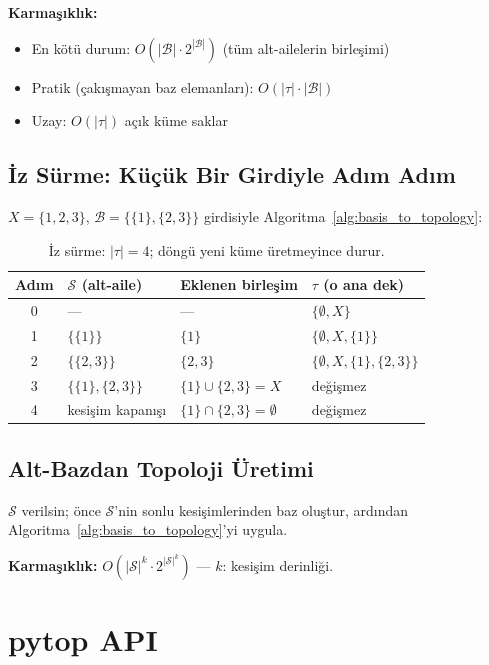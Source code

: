 \noindent\textbf{Karmaşıklık:}
\begin{itemize}
  \item En kötü durum: $O(|\mathcal{B}| \cdot 2^{|\mathcal{B}|})$
        (tüm alt-ailelerin birleşimi)
  \item Pratik (çakışmayan baz elemanları): $O(|\tau| \cdot |\mathcal{B}|)$
  \item Uzay: $O(|\tau|)$ açık küme saklar
\end{itemize}

\subsection{İz Sürme: Küçük Bir Girdiyle Adım Adım}

$X=\{1,2,3\}$, $\mathcal{B}=\{\{1\},\{2,3\}\}$ girdisiyle
Algoritma~\ref{alg:basis_to_topology}:

\begin{table}[ht]
\centering
\begin{tabular}{clll}
\toprule
\textbf{Adım} & $\mathcal{S}$ (alt-aile) & \textbf{Eklenen birleşim} & $\tau$ \textbf{(o ana dek)} \\
\midrule
0 & --- & --- & $\{\emptyset, X\}$ \\
1 & $\{\{1\}\}$ & $\{1\}$ & $\{\emptyset, X, \{1\}\}$ \\
2 & $\{\{2,3\}\}$ & $\{2,3\}$ & $\{\emptyset, X, \{1\}, \{2,3\}\}$ \\
3 & $\{\{1\},\{2,3\}\}$ & $\{1\}\cup\{2,3\}=X$ & değişmez \\
4 & kesişim kapanışı & $\{1\}\cap\{2,3\}=\emptyset$ & değişmez \\
\bottomrule
\end{tabular}
\caption{İz sürme: $|\tau|=4$; döngü yeni küme üretmeyince durur.}
\end{table}

\subsection{Alt-Bazdan Topoloji Üretimi}

$\mathcal{S}$ verilsin; önce $\mathcal{S}$'nin sonlu kesişimlerinden baz oluştur,
ardından Algoritma~\ref{alg:basis_to_topology}'yi uygula.

\noindent\textbf{Karmaşıklık:} $O(|\mathcal{S}|^k \cdot 2^{|\mathcal{S}|^k})$ —
$k$: kesişim derinliği.

\section{pytop API}

